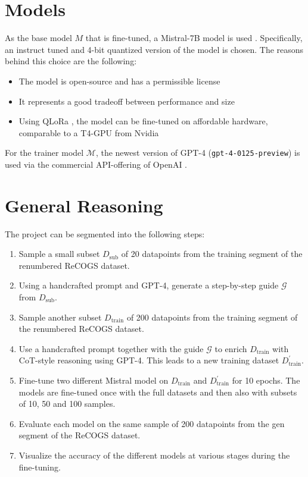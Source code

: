 \documentclass[11pt]{article}
\begin{document}
    \section{Models}

    As the base model $M$ that is fine-tuned, a Mistral-7B model is used \cite{jiang_mistral_2023}.
    Specifically, an instruct tuned and 4-bit quantized version of the model is chosen.
    The reasons behind this choice are the following:
    \begin{itemize}
        \item The model is open-source and has a permissible license
        \item It represents a good tradeoff between performance and size
        \item Using QLoRa \cite{dettmers_qlora_2023}, the model can be fine-tuned on affordable hardware, comparable to a T4-GPU from Nvidia
    \end{itemize}

    For the trainer model $\mathcal{M}$, the newest version of GPT-4 (\texttt{gpt-4-0125-preview}) is used via the
    commercial API-offering of OpenAI \cite{openai_gpt-4_2024}.


    \section{General Reasoning}\label{S:reasoning}

    The project can be segmented into the following steps:

    \begin{enumerate}
        \item Sample a small subset $D_\mathrm{sub}$ of 20 datapoints from the training segment of the renumbered ReCOGS dataset.
        \item Using a handcrafted prompt and GPT-4, generate a step-by-step guide $\mathcal{G}$ from $D_\mathrm{sub}$.
        \item Sample another subset $D_\mathrm{train}$ of 200 datapoints from the training segment of the renumbered ReCOGS dataset.
        \item Use a handcrafted prompt together with the guide $\mathcal{G}$ to enrich $D_\mathrm{train}$
        with CoT-style reasoning using GPT-4. This leads to a new training dataset $D_\mathrm{train}^\prime$.
        \item Fine-tune two different Mistral model on $D_\mathrm{train}$ and $D_\mathrm{train}^\prime$ for 10 epochs.
        The models are fine-tuned once with the full datasets and then also with subsets of 10, 50 and 100 samples.
        \item Evaluate each model on the same sample of 200 datapoints from the gen segment of the ReCOGS dataset.
        \item Visualize the accuracy of the different models at various stages during the fine-tuning.
    \end{enumerate}
\end{document}
